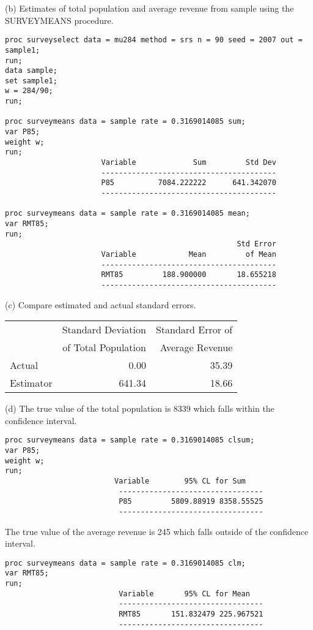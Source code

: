 \documentclass[12pt]{article}
\begin{document}
(b) Estimates of total population and average revenue from sample using the SURVEYMEANS procedure.
\begin{verbatim}
proc surveyselect data = mu284 method = srs n = 90 seed = 2007 out = sample1;
run;
data sample;
set sample1;
w = 284/90;
run;

proc surveymeans data = sample rate = 0.3169014085 sum;
var P85;
weight w;
run;
                      Variable             Sum         Std Dev
                      ----------------------------------------
                      P85          7084.222222      641.342070
                      ----------------------------------------

proc surveymeans data = sample rate = 0.3169014085 mean;
var RMT85;
run;
                                                     Std Error
                      Variable            Mean         of Mean
                      ----------------------------------------
                      RMT85         188.900000       18.655218
                      ----------------------------------------
\end{verbatim}

(c) Compare estimated and actual standard errors.

\begin{center}
\begin{tabular}{|l|r|r|}
\hline
& Standard Deviation & Standard Error of\\
& of Total Population & Average Revenue\\
\hline
Actual & 0.00 & 35.39\\
Estimator & 641.34 & 18.66\\
\hline
\end{tabular}
\end{center}

(d) The true value of the total population is 8339 which falls within the confidence interval.
\begin{verbatim}
proc surveymeans data = sample rate = 0.3169014085 clsum;
var P85;
weight w;
run;
                         Variable        95% CL for Sum
                          ---------------------------------
                          P85         5809.88919 8358.55525
                          ---------------------------------
\end{verbatim}

The true value of the average revenue is 245 which falls outside of the confidence interval.
\begin{verbatim}
proc surveymeans data = sample rate = 0.3169014085 clm;
var RMT85;
run;
                          Variable       95% CL for Mean
                          ---------------------------------
                          RMT85       151.832479 225.967521
                          ---------------------------------
\end{verbatim}
\end{document}
